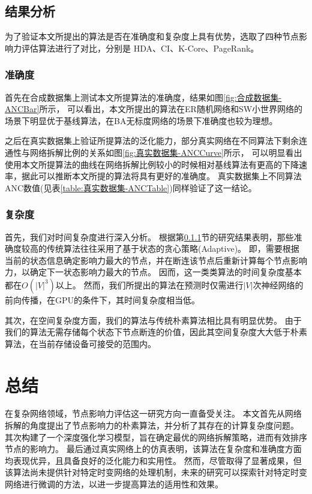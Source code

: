 \documentclass[twocolumn]{morningstar}
\begin{document}
\subsection{结果分析}\label{sec:ResultAnalysis}

为了验证本文所提出的算法是否在准确度和复杂度上具有优势，选取了四种节点影响力评估算法进行了对比，分别是
HDA\cite{cohen2001HDA}、CI、K-Core、PageRank。

\subsubsection{准确度}\label{sec:Accuracy}

首先在合成数据集上测试本文所提算法的准确度，结果如图\ref{fig:合成数据集-ANCBar}所示，
可以看出，本文所提出的算法在ER随机网络和SW小世界网络的场景下明显优于基线算法，在BA无标度网络的场景下准确度也较为理想。

之后在真实数据集上验证所提算法的泛化能力，部分真实网络在不同算法下剩余连通性与网络拆解比例的关系如图\ref{fig:真实数据集-ANCCurve}所示，
可以明显看出使用本文所提算法的曲线在网络拆解比例较小的时候相对基线算法有更高的下降速率，据此可以推断本文所提的算法将具有更好的准确度。
真实数据集上不同算法ANC数值(见表\ref{table:真实数据集-ANCTable})同样验证了这一结论。






\subsubsection{复杂度}\label{sec:Complexity}

首先，我们对时间复杂度进行深入分析。
根据第\ref{sec:Accuracy}节的研究结果表明，那些准确度较高的传统算法往往采用了基于状态的贪心策略(Adaptive)。
即，需要根据当前的状态信息确定影响力最大的节点，并在断连该节点后重新计算每个节点影响力，以确定下一状态影响力最大的节点。
因而，这一类类算法的时间复杂度基本都在$O(|V|^3)$以上。
然而，我们所提出的算法在预测时仅需进行$|V|$次神经网络的前向传播，在GPU的条件下，其时间复杂度相当低。

其次，在空间复杂度方面，我们的算法与传统朴素算法相比具有明显优势。
由于我们的算法无需存储每个状态下节点断连的价值，因此其空间复杂度大大低于朴素算法，在当前存储设备可接受的范围内。


\section{总结}\label{sec:Conclusion}

在复杂网络领域，节点影响力评估这一研究方向一直备受关注。
本文首先从网络拆解的角度提出了节点影响力的朴素算法，并分析了其存在的计算复杂度问题。
其次构建了一个深度强化学习模型，旨在确定最优的网络拆解策略，进而有效排序节点的影响力。
最后通过真实网络上的仿真表明，该算法在复杂度和准确度方面均表现优异，且具备良好的泛化能力和实用性。
然而，尽管取得了显著成果，但该算法尚未提供针对特定时变网络的处理机制，未来的研究可以探索针对特定时变网络进行微调的方法，以进一步提高算法的适用性和效果。

\end{document}
